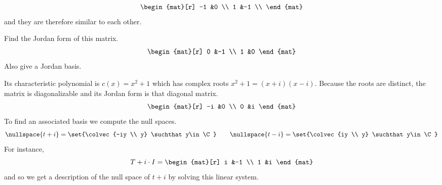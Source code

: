 \begin{exercises}
\begin{answer}
        \begin{equation*}
           \begin{mat}[r]
             -1  &0  \\
              1  &-1 \\
           \end{mat}
        \end{equation*}
        and they are therefore similar to each other.  
      \end{answer}
  \item 
     Find the Jordan form of this matrix.
     \begin{equation*}
        \begin{mat}[r]
           0  &-1  \\
           1  &0
        \end{mat}
     \end{equation*}
     Also give a Jordan basis.
     \begin{answer}
       Its characteristic polynomial is
       \( c(x)=x^2+1 \) which has complex roots
       \( x^2+1=(x+i)(x-i) \).
       Because the roots are distinct,
       the matrix is diagonalizable and its Jordan form is that
       diagonal matrix. 
       \begin{equation*}
         \begin{mat}[r]
           -i  &0  \\
            0  &i
         \end{mat}
       \end{equation*}  
       To find an associated basis we compute the null spaces.
       \begin{equation*}
         \nullspace{t+i}=\set{\colvec{-iy \\ y}
                                        \suchthat y\in\C} 
         \qquad
         \nullspace{t-i}=\set{\colvec{iy \\ y}
                                        \suchthat y\in\C} 
       \end{equation*}
       For instance, 
       \begin{equation*}
         T+i\cdot I=
         \begin{mat}[r]
           i  &-1  \\
           1  &i
         \end{mat}
       \end{equation*}
       and so we get a description of the null space of $t+i$ by solving
       this linear system.
       \begin{equation*}

\end{equation*}
\end{answer}
\end{exercises}
